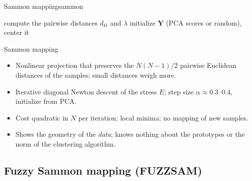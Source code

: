 \begin{algobox}{Sammon mapping}{sammon}
\begin{algorithm}[H]
compute the pairwise distances $d_{kl}$ and $\lambda$\;
initialize $\mathbf{Y}$ (PCA scores or random), center it\;
\end{algorithm}
\end{algobox}
\begin{summarybox}{Sammon mapping}
\begin{itemize}
  \item Nonlinear projection that preserves the $N(N-1)/2$ pairwise Euclidean distances of the samples; small distances weigh more.
  \item Iterative diagonal Newton descent of the stress $E$; step size $\alpha\approx0.3$--$0.4$, initialize from PCA.
  \item Cost quadratic in $N$ per iteration; local minima; no mapping of new samples.
  \item Shows the geometry of the \emph{data}; knows nothing about the prototypes or the norm of the clustering algorithm.
\end{itemize}
\end{summarybox}

\subsection{Fuzzy Sammon mapping (FUZZSAM)}\label{sec:viz:fuzzsam}

